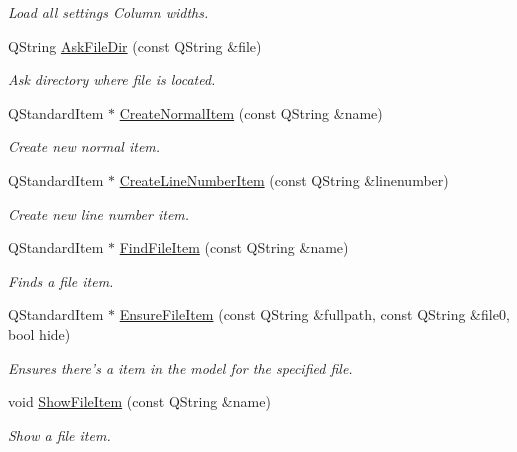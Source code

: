 \begin{DoxyCompactItemize}
\begin{DoxyCompactList}\small\item\em Load all settings Column widths. \end{DoxyCompactList}\item 
Q\-String \hyperlink{class_results_tree_a93d0cc42de0537cec1f9f6f271312e0a}{Ask\-File\-Dir} (const Q\-String \&file)
\begin{DoxyCompactList}\small\item\em Ask directory where file is located. \end{DoxyCompactList}\item 
Q\-Standard\-Item $\ast$ \hyperlink{class_results_tree_a2970e0780523e3ed847c6f5f5e346fa3}{Create\-Normal\-Item} (const Q\-String \&name)
\begin{DoxyCompactList}\small\item\em Create new normal item. \end{DoxyCompactList}\item 
Q\-Standard\-Item $\ast$ \hyperlink{class_results_tree_a11851e5873648b1f509ba8846c6bd77d}{Create\-Line\-Number\-Item} (const Q\-String \&linenumber)
\begin{DoxyCompactList}\small\item\em Create new line number item. \end{DoxyCompactList}\item 
Q\-Standard\-Item $\ast$ \hyperlink{class_results_tree_a87bcc32fe12e3e498e521b11715ddb29}{Find\-File\-Item} (const Q\-String \&name)
\begin{DoxyCompactList}\small\item\em Finds a file item. \end{DoxyCompactList}\item 
Q\-Standard\-Item $\ast$ \hyperlink{class_results_tree_a03c27356a21d78982fb72e6a1e56e235}{Ensure\-File\-Item} (const Q\-String \&fullpath, const Q\-String \&file0, bool hide)
\begin{DoxyCompactList}\small\item\em Ensures there's a item in the model for the specified file. \end{DoxyCompactList}\item 
void \hyperlink{class_results_tree_ab5c6637de7b81e0808963ab24c26fbf0}{Show\-File\-Item} (const Q\-String \&name)
\begin{DoxyCompactList}\small\item\em Show a file item. \end{DoxyCompactList}\end{DoxyCompactItemize}

